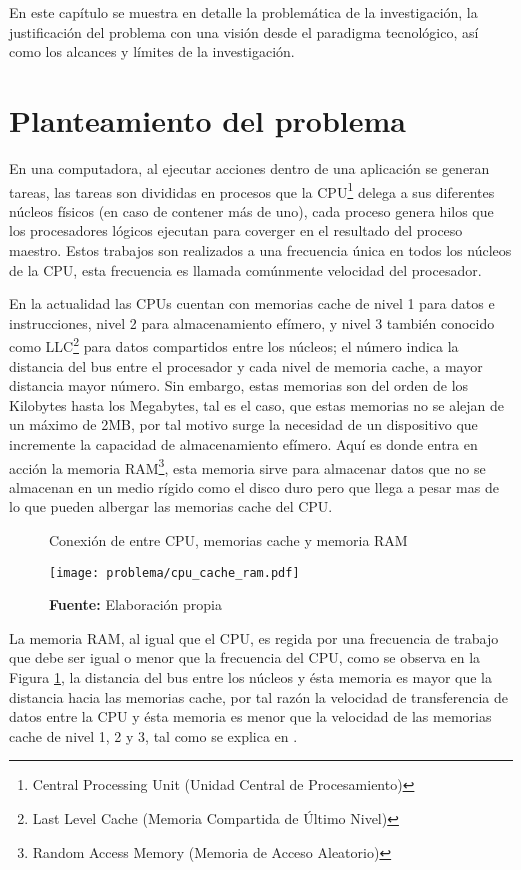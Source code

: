 \documentclass[../main/main.tex]{subfiles}
\begin{document}
\espacio

  En este capítulo se muestra en detalle la problemática de la investigación, la justificación del problema con una visión desde el paradigma tecnológico, así como los alcances y límites de la investigación.

  \section{Planteamiento del problema}

  En una computadora, al ejecutar acciones dentro de una aplicación se generan tareas, las tareas son divididas en procesos que la CPU\footnote{Central Processing Unit (Unidad Central de Procesamiento)} delega a sus diferentes núcleos físicos (en caso de contener más de uno), cada proceso genera hilos que los procesadores lógicos ejecutan para coverger en el resultado del proceso maestro. Estos trabajos son realizados a una frecuencia única en todos los núcleos de la CPU, esta frecuencia es llamada comúnmente velocidad del procesador.

  En la actualidad las CPUs cuentan con memorias cache de nivel 1 para datos e instrucciones, nivel 2 para almacenamiento efímero, y nivel 3 también conocido como LLC\footnote{Last Level Cache (Memoria Compartida de Último Nivel)} para datos compartidos entre los núcleos; el número indica la distancia del bus entre el procesador y cada nivel de memoria cache, a mayor distancia mayor número. Sin embargo, estas memorias son del orden de los Kilobytes hasta los Megabytes, tal es el caso, que estas memorias no se alejan de un máximo de 2MB, por tal motivo surge la necesidad de un dispositivo que incremente la capacidad de almacenamiento efímero. Aquí es donde entra en acción la memoria RAM\footnote{Random Access Memory (Memoria de Acceso Aleatorio)}, esta memoria sirve para almacenar datos que no se almacenan en un medio rígido como el disco duro pero que llega a pesar mas de lo que pueden albergar las memorias cache del CPU.

  \begin{figure}[ht]
    \centering
    \caption{Conexión de entre CPU, memorias cache y memoria RAM}
    \texttt{[image: problema/cpu\_cache\_ram.pdf]}
    \caption*{\textbf{Fuente:} Elaboración propia}
    \label{fig:cpu_cache_ram}
  \end{figure}

  La memoria RAM, al igual que el CPU, es regida por una frecuencia de trabajo que debe ser igual o menor que la frecuencia del CPU, como se observa en la Figura \ref{fig:cpu_cache_ram}, la distancia del bus entre los núcleos y ésta memoria es mayor que la distancia hacia las memorias cache, por tal razón la velocidad de transferencia de datos entre la CPU y ésta memoria es menor que la velocidad de las memorias cache de nivel 1, 2 y 3, tal como se explica en \cite[p.~126]{book:computer_architecture_stallings}.
\end{document}
